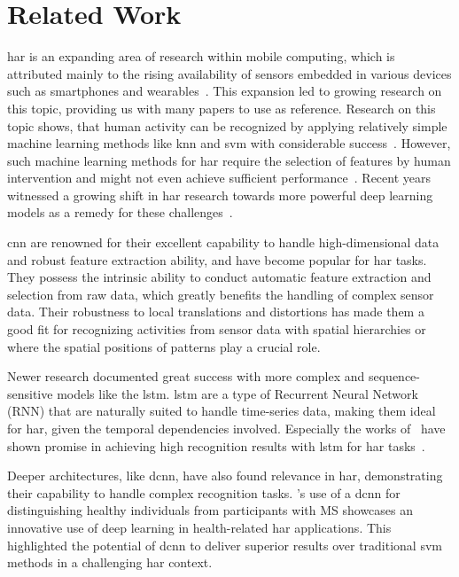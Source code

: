 \section{Related Work}\label{sec:related-work}

\gls{har} is an expanding area of research within mobile computing, which is attributed mainly to the rising availability of sensors embedded in various devices such as smartphones and wearables~\autocite{li2021deep, zhang2022sensors}.
This expansion led to growing research on this topic, providing us with many papers to use as reference.
Research on this topic shows, that human activity can be recognized by applying relatively simple machine learning methods like \gls{knn} and \gls{svm} with considerable success~\cite{Bustoni2020svmknn, zhao2018deep}.
However, such machine learning methods for \gls{har} require the selection of features by human intervention and might not even achieve sufficient performance~\cite{li2021deep}.
Recent years witnessed a growing shift in \gls{har} research towards more powerful deep learning models as a remedy for these challenges~\cite{gu2021survey}.

\gls{cnn} are renowned for their excellent capability to handle high-dimensional data and robust feature extraction ability, and have become popular for \gls{har} tasks.
They possess the intrinsic ability to conduct automatic feature extraction and selection from raw data, which greatly benefits the handling of complex sensor data.
Their robustness to local translations and distortions has made them a good fit for recognizing activities from sensor data with spatial hierarchies or where the spatial positions of patterns play a crucial role.
~\cite{zhao2018deep, yang2015deep}

Newer research documented great success with more complex and sequence-sensitive models like the \gls{lstm}.
\gls{lstm} are a type of Recurrent Neural Network (RNN) that are naturally suited to handle time-series data, making them ideal for \gls{har}, given the temporal dependencies involved.
Especially the works of~\citeauthor{zhao2018deep} have shown promise in achieving high recognition results with \gls{lstm} for \gls{har} tasks~\cite{zhao2018deep,gu2021survey}.

Deeper architectures, like \gls{dcnn}, have also found relevance in \gls{har}, demonstrating their capability to handle complex recognition tasks.
's use of a \gls{dcnn} for distinguishing healthy individuals from participants with MS showcases an innovative use of deep learning in health-related \gls{har} applications.
This highlighted the potential of \gls{dcnn} to deliver superior results over traditional \gls{svm} methods in a challenging \gls{har} context.
~\cite{creagh2021dcnn}

